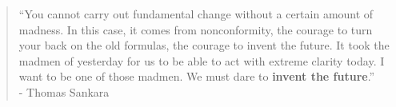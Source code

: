 \begin{dedication}

\begin{quote}
``You cannot carry out fundamental change without a certain amount of
madness. In this case, it comes from nonconformity, the courage to turn
your back on the old formulas, the courage to invent the future. It took
the madmen of yesterday for us to be able to act with extreme clarity
today. I want to be one of those madmen. We must dare to \textbf{invent the
future}.''\\
 - Thomas Sankara
\end{quote}

\end{dedication}
